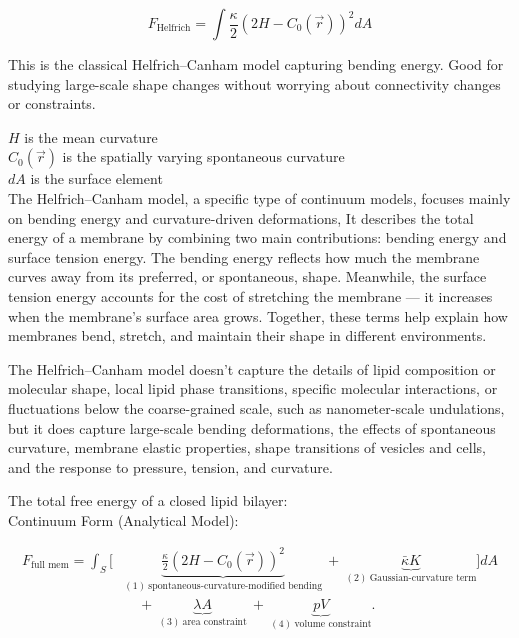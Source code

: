 \documentclass[12pt]{article}
\begin{document}
\begin{flushleft}
\vspace{-1em} 


\begin{equation}
F_{\text{Helfrich}} = \int \frac{\kappa}{2} \left( 2H - C_0(\vec{r}) \right)^2 dA
\end{equation}

This is the classical Helfrich–Canham model capturing bending energy. Good for studying large-scale shape changes without worrying about connectivity changes or constraints.


\( H \) is the mean curvature\\
\( C_0(\vec{r}) \) is the spatially varying spontaneous curvature\\
\( dA \) is the surface element\\

The Helfrich–Canham model, a specific type of continuum models, focuses mainly on bending energy and curvature-driven deformations, It describes the total energy of a membrane by combining two main contributions: bending energy and surface tension energy. The bending energy reflects how much the membrane curves away from its preferred, or spontaneous, shape. Meanwhile, the surface tension energy accounts for the cost of stretching the membrane — it increases when the membrane's surface area grows. Together, these terms help explain how membranes bend, stretch, and maintain their shape in different environments.

The Helfrich–Canham model doesn't capture the details of lipid composition or molecular shape, local lipid phase transitions, specific molecular interactions, or fluctuations below the coarse-grained scale, such as nanometer-scale undulations, but it does capture large-scale bending deformations, the effects of spontaneous curvature, membrane elastic properties, shape transitions of vesicles and cells, and the response to pressure, tension, and curvature.


The total free energy of a closed lipid bilayer:\\
Continuum Form (Analytical Model):
\vspace{-1em}


\begin{align}
F_\text{full mem} = \int_S \Bigg[
&\underbrace{\frac{\kappa}{2} \left(2H - C_0(\vec{r}) \right)^2}_{(1)\ \text{spontaneous-curvature-modified bending}} 
\ + \ 
\underbrace{\bar{\kappa} K}_{(2)\ \text{Gaussian-curvature term}} 
\Bigg] dA \nonumber \\
&\quad + \ 
\underbrace{\lambda A}_{(3)\ \text{area constraint}} 
\ + \ 
\underbrace{p V}_{(4)\ \text{volume constraint}}.
\end{align}





\end{flushleft}
\end{document}
